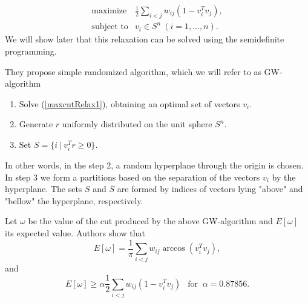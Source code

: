 \documentclass[12pt]{book}
\theoremstyle{definition}
\begin{document}
\begin{equation}
\label{maxcutRelax1}
\begin{array}{ll}
\mbox{maximize} & \frac{1}{2}\sum_{i<j}w_{ij}(1-v_i^Tv_j ), \\
\mbox{subject to} &  v_i \in S^n \ (i = 1,\dots ,n).
\end{array}
\end{equation}
We will show later that this relaxation can be solved using the semidefinite programming.

They propose simple randomized algorithm, which we will refer to as GW-algorithm
\begin{enumerate}
\item Solve (\ref{maxcutRelax1}), obtaining an optimal set of vectors $v_i$.
\item Generate $r$ uniformly distributed on the unit sphere $S^n$.
\item Set $S = \{i\ | \ v_i^Tr \geq 0\}.$
\end{enumerate}
In other words, in the step 2, a random hyperplane through the origin is chosen. In step 3 we form a partitions based on the separation of the vectors $v_i$ by the hyperplane. The sets $S$ and $\bar{S}$ are formed by indices of vectors lying "above" and "bellow" the hyperplane, respectively.

\prop [{[\ref{GoemansWilliamsonMaxCut}]}]
\label{maxcutProp}
Let $\omega$ be the value of the cut produced by the above GW-algorithm and $E[\omega]$ its expected value. Authors show that
\begin{equation}
\label{maxcutExp1}
E[\omega] = 	\frac{1}{\pi}\sum_{i<j}w_{ij}\arccos(v_i^Tv_j ), 
\end{equation}
and 
\begin{equation}
\label{maxcutExp2}
E[\omega]  \geq \alpha\frac{1}{2}\sum_{i<j}w_{ij}(1-v_i^Tv_j) \ \ \mbox{ for } \ \alpha = 0.87856.
\end{equation}
\end{document}
